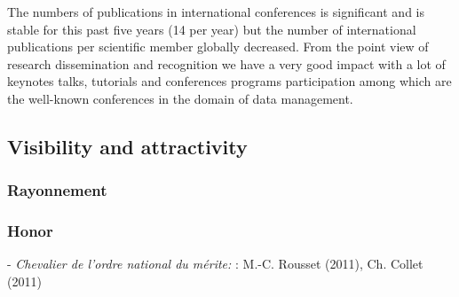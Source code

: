 The numbers of publications in international conferences is significant and is stable for this past five years (14 per year) but the number of international publications per scientific member globally decreased. 
From the point view of research dissemination and recognition we have a very good impact with a lot of keynotes talks, tutorials and conferences
programs participation among which are the well-known conferences in the domain of data management. 


 

\subsection{Visibility and attractivity} %
\label{sub:hadas_visibility_and_attractivity}


\subsubsection{Rayonnement}

\subsubsection*{Honor}
-  {\it Chevalier de l'ordre national du m{\'e}rite: }: M.-C. Rousset (2011), Ch. Collet (2011)

